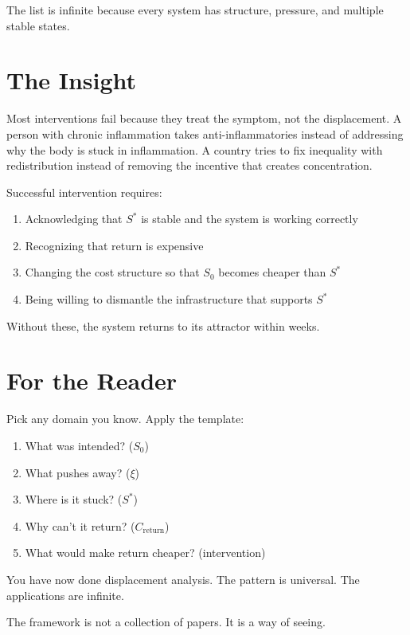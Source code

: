 \documentclass[12pt]{article}
\theoremstyle{definition}
\theoremstyle{remark}
\begin{document}
The list is infinite because every system has structure, pressure, and multiple stable states.

\section{The Insight}

Most interventions fail because they treat the symptom, not the displacement. A person with chronic inflammation takes anti-inflammatories instead of addressing why the body is stuck in inflammation. A country tries to fix inequality with redistribution instead of removing the incentive that creates concentration.

Successful intervention requires:
\begin{enumerate}
\item Acknowledging that $S^*$ is stable and the system is working correctly
\item Recognizing that return is expensive
\item Changing the cost structure so that $S_0$ becomes cheaper than $S^*$
\item Being willing to dismantle the infrastructure that supports $S^*$
\end{enumerate}

Without these, the system returns to its attractor within weeks.

\section{For the Reader}

Pick any domain you know. Apply the template:
\begin{enumerate}
\item What was intended? ($S_0$)
\item What pushes away? ($\xi$)
\item Where is it stuck? ($S^*$)
\item Why can't it return? ($C_{\text{return}}$)
\item What would make return cheaper? (intervention)
\end{enumerate}

You have now done displacement analysis. The pattern is universal. The applications are infinite.

The framework is not a collection of papers. It is a way of seeing.
\end{document}
